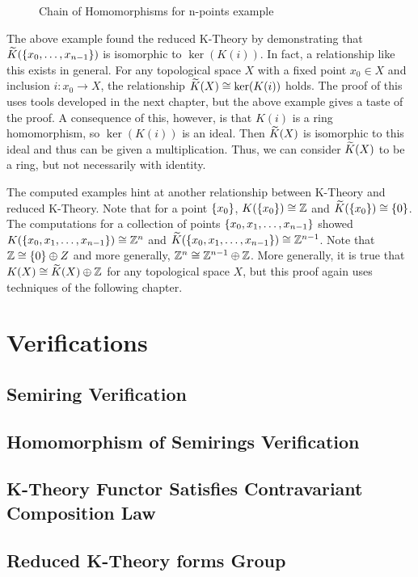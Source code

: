 \documentclass[../sean_thesis.tex]{subfiles}
\begin{document}
\begin{figure}[ht!]
	
	\caption{Chain of Homomorphisms for n-points example}
	\label{fig:n_points_rk_cd}
\end{figure}

The above example found the reduced K-Theory by demonstrating that $\widetilde{K}(\left\{x_0, \dots, x_{n-1}\right\})$ is isomorphic to $\ker(K(i)).$ In fact, a relationship like this exists in general. For any topological space $X$ with a fixed point $x_0 \in X$ and inclusion $i: x_0 \to X$, the relationship $\widetilde{K}(X) \cong \ker(K(i))$ holds. The proof of this uses tools developed in the next chapter, but the above example gives a taste of the proof. A consequence of this, however, is that $K(i)$ is a ring homomorphism, so $\ker(K(i))$ is an ideal. Then $\widetilde{K}(X)$ is isomorphic to this ideal and thus can be given a multiplication. Thus, we can consider $\widetilde{K}(X)$ to be a ring, but not necessarily with identity.

The computed examples hint at another relationship between K-Theory and reduced K-Theory. Note that for a point $\left\{x_0\right\}$, $K(\left\{x_0\right\}) \cong \mathbb{Z}$ and $\widetilde{K}(\left\{x_0\right\}) \cong \left\{0\right\}$. The computations for a collection of points $\left\{x_0, x_1, \dots, x_{n-1}\right\}$ showed $K(\left\{x_0, x_1, \dots, x_{n-1}\right\}) \cong \mathbb{Z}^n$ and $\widetilde{K}(\left\{x_0, x_1, \dots, x_{n-1}\right\}) \cong \mathbb{Z}^{n-1}$. Note that $\mathbb{Z} \cong \left\{0\right\} \oplus Z$ and more generally, $\mathbb{Z}^n \cong \mathbb{Z}^{n-1} \oplus \mathbb{Z}$. More generally, it is true that $K(X) \cong \widetilde{K}(X) \oplus \mathbb{Z}$ for any topological space $X$, but this proof again uses techniques of the following chapter.

\section{Verifications}
\subsection{Semiring Verification}
\label{sec:semiring_verification}


\subsection{Homomorphism of Semirings Verification}
\label{sec:hm_of_semirings_verification}


\subsection{K-Theory Functor Satisfies Contravariant Composition Law}
\label{sec:contravariant_composistion_k}


\subsection{Reduced K-Theory forms Group}
\label{sec:reduced_k_group}

\end{document}
